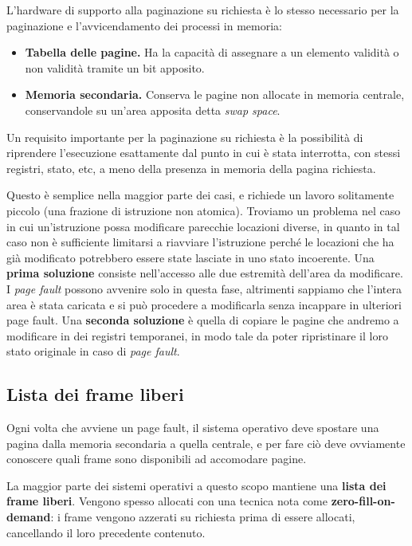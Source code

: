         L'hardware di supporto alla paginazione su richiesta è lo stesso necessario per la paginazione e l'avvicendamento dei processi in memoria:
        \begin{itemize}
            \item \textbf{Tabella delle pagine.} Ha la capacità di assegnare a un elemento validità o non validità tramite un bit apposito.
            
            \item \textbf{Memoria secondaria.} Conserva le pagine non allocate in memoria centrale, conservandole su un'area apposita detta \textit{swap space}.
        \end{itemize}
        
        Un requisito importante per la paginazione su richiesta è la possibilità di riprendere l'esecuzione esattamente dal punto in cui è stata interrotta, con stessi registri, stato, etc, a meno della presenza in memoria della pagina richiesta.
        
        Questo è semplice nella maggior parte dei casi, e richiede un lavoro solitamente piccolo (una frazione di istruzione non atomica). Troviamo un problema nel caso in cui un'istruzione possa modificare parecchie locazioni diverse, in quanto in tal caso non è sufficiente limitarsi a riavviare l'istruzione perché le locazioni che ha già modificato potrebbero essere state lasciate in uno stato incoerente. Una \textbf{prima soluzione} consiste nell'accesso alle due estremità dell'area da modificare. I \textit{page fault} possono avvenire solo in questa fase, altrimenti sappiamo che l'intera area è stata caricata e si può procedere a modificarla senza incappare in ulteriori page fault. Una \textbf{seconda soluzione} è quella di copiare le pagine che andremo a modificare in dei registri temporanei, in modo tale da poter ripristinare il loro stato originale in caso di \textit{page fault}.
        
    \subsection{Lista dei frame liberi}
        Ogni volta che avviene un page fault, il sistema operativo deve spostare una pagina dalla memoria secondaria a quella centrale, e per fare ciò deve ovviamente conoscere quali frame sono disponibili ad accomodare pagine.
        
        La maggior parte dei sistemi operativi a questo scopo mantiene una \textbf{lista dei frame liberi}. Vengono spesso allocati con una tecnica nota come \textbf{zero-fill-on-demand}: i frame vengono azzerati su richiesta prima di essere allocati, cancellando il loro precedente contenuto.
        
